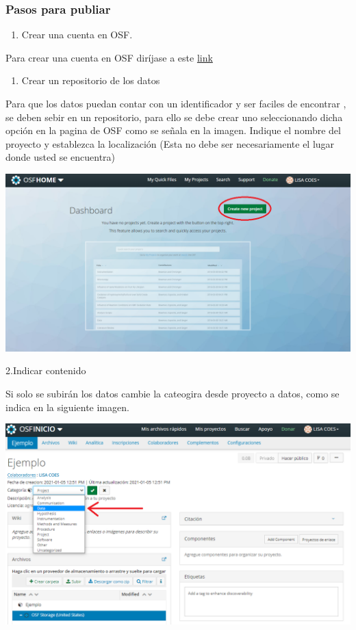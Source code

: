 \documentclass[
  14pt,
]{book}
\providecommand{\tightlist}{%
  \setlength{\itemsep}{0pt}\setlength{\parskip}{0pt}}
\begin{document}
\hypertarget{pasos-para-publiar}{%
\subsubsection{Pasos para publiar}\label{pasos-para-publiar}}

\begin{enumerate}
\def\labelenumi{\arabic{enumi}.}
\setcounter{enumi}{-1}
\tightlist
\item
  Crear una cuenta en OSF.
\end{enumerate}

Para crear una cuenta en OSF diríjase a este \href{https://osf.io/register?campaign=\&next=https\%3A\%2F\%2Fosf.io\%2F\&view_only=}{link}

\begin{enumerate}
\def\labelenumi{\arabic{enumi}.}
\tightlist
\item
  Crear un repositorio de los datos
\end{enumerate}

Para que los datos puedan contar con un identificador y ser faciles de encontrar , se deben sebir en un repositorio, para ello se debe crear uno seleccionando dicha opción en la pagina de OSF como se señala en la imagen. Indique el nombre del proyecto y establezca la localización (Esta no debe ser necesariamente el lugar donde usted se encuentra)

\begin{center}\includegraphics[width=0.5\linewidth,]{images/crearrepo} \end{center}

2.Indicar contenido

Si solo se subirán los datos cambie la cateogira desde proyecto a datos, como se indica en la siguiente imagen.

\begin{center}\includegraphics[width=0.5\linewidth,]{images/cambiaradatos} \end{center}
\end{document}
